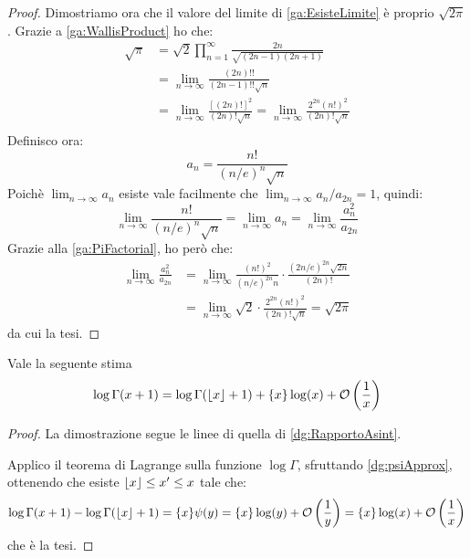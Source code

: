 \begin{proof}
	Dimostriamo ora che il valore del limite di \cref{ga:EsisteLimite} è proprio $\sqrt{2\pi}$.
	Grazie a \cref{ga:WallisProduct} ho che:
	\begin{equation}\label{ga:PiFactorial}
	\begin{split}
		\sqrt{\pi}	& =\sqrt{2}\prod_{n=1}^\infty\frac{2n}{\sqrt{(2n-1)(2n+1)}}\\
					& =\lim_{n\to\infty}\frac{(2n)!!}{(2n-1)!!\sqrt{n}}\\
					& =\lim_{n\to\infty}\frac{\left[(2n)!\right]^2}{(2n)!\sqrt{n}}=\lim_{n\to\infty}\frac{2^{2n}\left(n!\right)^2}{(2n)!\sqrt{n}}\\
	\end{split}
	\end{equation}
	Definisco ora:
	\begin{equation*}
		a_n=\frac{n!}{(n/e)^n\sqrt{n}}
	\end{equation*}
	Poichè $\lim_{n\to\infty}{a_n}$ esiste vale facilmente che $\lim_{n\to\infty}a_n/a_{2n}=1$, quindi:
	\begin{equation*}
		\lim_{n\to\infty}{\frac{n!}{(n/e)^n\sqrt{n}}}=\lim_{n\to\infty}{a_n}=\lim_{n\to\infty}{\frac{a_n^2}{a_{2n}}}
	\end{equation*}
	Grazie alla \cref{ga:PiFactorial}, ho però che:
	\begin{equation*}
	\begin{split}
		\lim_{n\to\infty}{\frac{a_n^2}{a_{2n}}}
		&=\lim_{n\to\infty}{\frac{\left(n!\right)^2}{(n/e)^{2n}n}\cdot \frac{(2n/e)^{2n}\sqrt{2n}}{(2n)!} }\\
		&=\lim_{n\to\infty}{\sqrt{2}\cdot\frac{2^{2n} \left(n!\right)^2}{(2n)!\sqrt{n}} }=\sqrt{2\pi}
	\end{split}
	\end{equation*}
	da cui la tesi.




	

\end{proof}



\begin{lemma}\label{ga:ApproxReali}
	Vale la seguente stima
	\begin{equation*}
		\log{\Gamma(x+1)}=\log{\Gamma(\ensuremath{\left\lfloor x \right\rfloor} +1)}+\{x\}\log(x)+\mathcal{O}\left(\frac 1x\right)
	\end{equation*}
\end{lemma}
\begin{proof}
	La dimostrazione segue le linee di quella di \cref{dg:RapportoAsint}.
	
	Applico il teorema di Lagrange sulla funzione $\log\Gamma$, sfruttando \cref{dg:psiApprox}, ottenendo che esiste
	$\left\lfloor x \right\rfloor\le x'\le x$ tale che:
	\begin{equation}
		\log{\Gamma(x+1)}-\log{\Gamma(\ensuremath{\left\lfloor x \right\rfloor} +1)}=\{x\}\psi(y)=\{x\}\log(y)+\mathcal{O}\left(\frac 1y\right)=
		\{x\}\log(x)+\mathcal{O}\left(\frac 1x\right)
	\end{equation}
	che è la tesi.
\end{proof}

